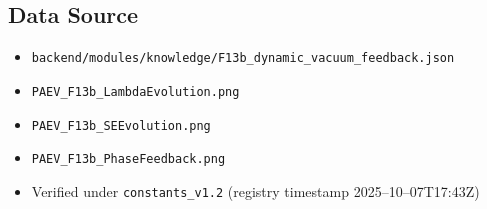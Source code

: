 \documentclass{article}
\begin{document}
\subsection*{Data Source}
\begin{itemize}
  \item \texttt{backend/modules/knowledge/F13b\_dynamic\_vacuum\_feedback.json}
  \item \texttt{PAEV\_F13b\_LambdaEvolution.png}
  \item \texttt{PAEV\_F13b\_SEEvolution.png}
  \item \texttt{PAEV\_F13b\_PhaseFeedback.png}
  \item Verified under \texttt{constants\_v1.2} (registry timestamp 2025--10--07T17:43Z)
\end{itemize}
\end{document}
